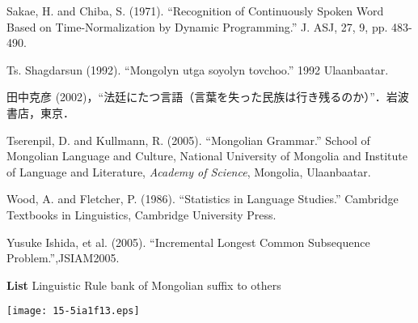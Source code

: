 \documentclass[english]{jnlp_1.4}
\begin{document}
\begin{thebibliography}{}
\item
Sakae, H. and Chiba, S. (1971). ``Recognition of Continuously Spoken Word 
Based on Time-Normalization by Dynamic Programming.'' J. ASJ, 27, 9, pp. 
483-490.

\item
Ts. Shagdarsun (1992). ``Mongolyn utga soyolyn tovchoo.'' 1992 Ulaanbaatar.

\item
田中克彦 (2002)，``法廷にたつ言語（言葉を失った民族は行き残るのか）''．岩波書店，東京．

\item
Tserenpil, D. and Kullmann, R. (2005). ``Mongolian Grammar.'' School of 
Mongolian Language and Culture, National University of Mongolia and 
Institute of Language and Literature, \textit{Academy of Science}, Mongolia, Ulaanbaatar.

\item
Wood, A. and Fletcher, P. (1986). ``Statistics in Language Studies.'' 
Cambridge Textbooks in Linguistics, Cambridge University Press.

\item
Yusuke Ishida, et al. (2005). ``Incremental Longest Common Subsequence 
Problem.'',JSIAM2005.

\end{thebibliography}



\clearpage
{\small\textbf{List} Linguistic Rule bank of Mongolian suffix to others}
\vspace{1ex}

\centerline{\texttt{[image: 15-5ia1f13.eps]}}
\label{fig40}
\end{document}
